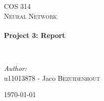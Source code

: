 
\begin{titlepage}
\begin{center}


\textsc{\LARGE COS 314}\\[1.5cm]

\textsc{\large Neural Network}\\[0.5cm]

\HRule \\[0.4cm]
{ \huge \bfseries Project 3: Report  \\[0.4cm] }

\HRule \\[1.5cm]

\noindent
\begin{minipage}{0.4\textwidth}
\begin{flushleft} \large
\emph{Author:}\\
u11013878 - Jaco \textsc{Bezuidenhout}\\




\end{flushleft}
\end{minipage}
\begin{minipage}{0.4\textwidth}
\begin{flushright} \large

\end{flushright}
\end{minipage}





\vfill


{\large \today}

\end{center}
\end{titlepage}
